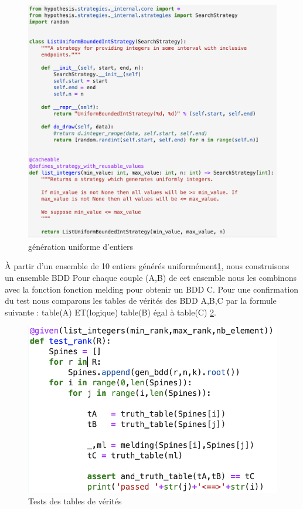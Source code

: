 \documentclass[french]{article}
\begin{document}
\begin{figure}[h!]
    \centering
    \includegraphics[scale=0.4]{geration_uniform.png}
    \caption{génération uniforme d'entiers}
    \label{fig:geration_uniforme}
\end{figure}

À partir d'un ensemble de 10 entiers générés uniformément\ref{fig:geration_uniforme}, nous construisons un ensemble BDD
Pour chaque couple (A,B) de cet ensemble nous les combinons avec la fonction fonction melding pour
obtenir un BDD C. Pour une confirmation du test nous comparons les tables de vérités des BDD {A,B,C}  par la formule suivante : table(A) ET(logique) table(B) égal à table(C) \ref{fig:test_rank}.

\begin{figure}[h!]
    \centering
    \includegraphics[scale=0.4]{test_rank.png}
    \caption{Tests des tables de vérités}
    \label{fig:test_rank}
\end{figure}
\end{document}
